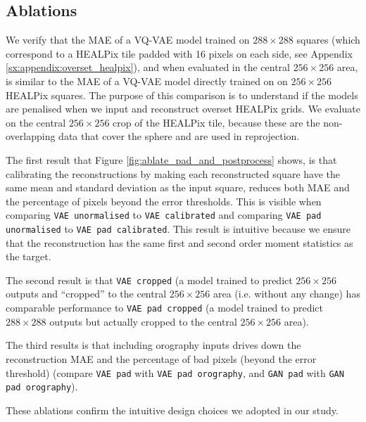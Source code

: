 \subsection{Ablations}

We verify that the MAE of a VQ-VAE model trained on $288 \times 288$ squares (which correspond to a HEALPix tile padded with 16 pixels on each side, see Appendix \ref{sx:appendix:overset_healpix}), and when evaluated in the central $256 \times 256$ area, is similar to the MAE of a VQ-VAE model directly trained on on $256 \times 256$ HEALPix squares. The purpose of this comparison is to understand if the models are penalised when we input and reconstruct overset HEALPix grids. We evaluate on the central $256 \times 256$ crop of the HEALPix tile, because these are the non-overlapping data that cover the sphere and are used in reprojection.

The first result that Figure \ref{fig:ablate_pad_and_postprocess} shows, is that calibrating the reconstructions by making each reconstructed square have the same mean and standard deviation as the input square, reduces both MAE and the percentage of pixels beyond the error thresholds. This is visible when comparing {\tt VAE unormalised} to {\tt VAE calibrated} and comparing {\tt VAE pad unormalised} to {\tt VAE pad calibrated}. This result is intuitive because we ensure that the reconstruction has the same first and second order moment statistics as the target. 

The second result is that {\tt VAE cropped} (a model trained to predict $256 \times 256$ outputs and ``cropped'' to the central $256 \times 256$ area (i.e. without any change) has comparable performance to {\tt VAE pad cropped} (a model trained to predict $288 \times 288$ outputs but actually cropped to the central $256 \times 256$ area).

The third results is that including orography inputs drives down the reconstruction MAE and the percentage of bad pixels (beyond the error threshold) (compare {\tt VAE pad} with {\tt VAE pad orography}, and {\tt GAN pad} with {\tt GAN pad orography}).

These ablations confirm the intuitive design choices we adopted in our study.


